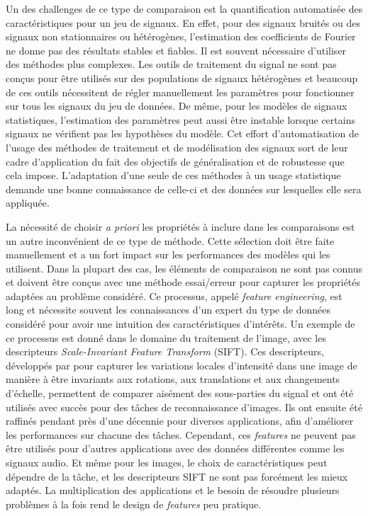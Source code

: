 \documentclass[../thesis.tex]{subfiles}
\begin{document}
	Un des challenges de ce type de comparaison est la quantification automatisée des
	caractéristiques pour un jeu de signaux. En effet, pour des signaux bruités ou des
	signaux non stationnaires ou hétérogènes, l'estimation des coefficients de Fourier
	ne donne pas des résultats stables et fiables. Il est souvent nécessaire d'utiliser
	des méthodes plus complexes. Les outils de traitement du signal ne sont pas
	conçus pour être utilisés sur des populations de signaux hétérogènes et beaucoup de
	ces outils nécessitent de régler manuellement les paramètres pour fonctionner sur
	tous les signaux du jeu de données. De même, pour les modèles de signaux statistiques,
	l'estimation des paramètres peut aussi être instable lorsque certains signaux ne
	vérifient pas les hypothèses du modèle. Cet effort d'automatisation de l'usage des
	méthodes de traitement et de modélisation des signaux sort de leur cadre d'application
	du fait des objectifs de généralisation et de robustesse que cela impose. L'adaptation
	d'une seule de ces méthodes à un usage statistique demande une bonne connaissance de
	celle-ci et des données sur lesquelles elle sera appliquée.


	La nécessité de choisir \emph{a priori} les propriétés à inclure dans les comparaisons est
	un autre inconvénient de ce type de méthode. Cette sélection doit être faite manuellement
	et a un fort impact sur les performances des modèles qui les utilisent. Dans la plupart des
	cas, les éléments de comparaison ne sont pas connus et doivent être conçus avec une méthode
	essai/erreur pour capturer les propriétés adaptées au problème considéré. Ce processus,
	appelé \emph{feature engineering}, est long et nécessite souvent les connaissances d'un
	expert du type de données considéré pour avoir une intuition des caractéristiques d'intérêts.
	Un exemple de ce processus est donné dans le domaine du traitement de l'image, avec les
	descripteurs \emph{Scale-Invariant Feature Transform} (SIFT). Ces descripteurs, développés par
	\cite{Lowe1999} pour capturer les variations locales d'intensité dans une image de manière
	à être invariants aux rotations, aux translations et aux changements d'échelle, permettent
	de comparer aisément des sous-parties du signal et ont été utilisés avec succès pour des
	tâches de reconnaissance d'images. Ils ont ensuite été raffinés pendant près d'une décennie
	pour diverses applications, afin d'améliorer les performances sur chacune des tâches. Cependant,
	ces \emph{features} ne peuvent pas être utilisés pour d'autres applications avec des données
	différentes comme les signaux audio. Et même pour les images, le choix de caractéristiques peut
	dépendre de la tâche, et les descripteurs SIFT ne sont pas forcément les mieux adaptés.
	La multiplication des applications et le besoin de résoudre plusieurs problèmes à la fois
	rend le design de \emph{features} peu pratique.
\end{document}
